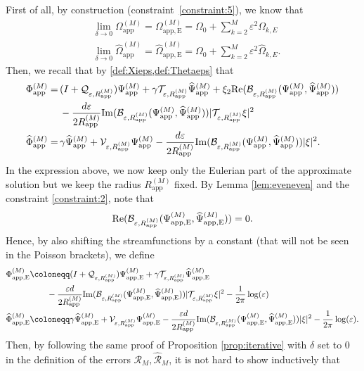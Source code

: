 \documentclass[11pt,reqno,a4paper]{amsart}
\def\eps{\varepsilon}
\def\Re{{\rm Re}}
\def\Im{{\rm Im}}
\newcommand{\cB}{\mathcal{B}}
\newcommand{\cQ}{\mathcal{Q}}
\newcommand{\cR}{\mathcal{R}}
\newcommand{\cT}{\mathcal{T}}
\newcommand{\cV}{\mathcal{V}}
\newcommand{\1}{\mathbbm{1}}
\theoremstyle{definition}
\theoremstyle{definition}
\numberwithin{equation}{section}
\newcommand{\Mapp}[2]{#1^{(#2)}_\mathrm{app}}
\newcommand{\Mappp}[3]{#1^{(#2)}_\mathrm{app,#3}}
\begin{document}
First of all, by construction (constraint~\ref{constraint:5}), we know that 
\begin{align}
\label{def:OmE}
    &\lim_{\delta \to 0}\Mapp{\Omega}{M}=\Mappp{\Omega}{M}{E}=\Omega_0+\sum_{k=2}^M\eps^2\Omega_{k,E}\\
    \label{def:OmhE}&\lim_{\delta \to 0}\Mapp{\widehat \Omega}{M}=\Mappp{\widehat \Omega}{M}{E}=\Omega_0+\sum_{k=2}^M\eps^2\widehat{\Omega}_{k,E}.
\end{align}
Then, we recall that by \cref{def:Xieps,def:Thetaeps} that
\begin{align}
    \Mapp{\Phi}{M}=\,&(I+\cQ_{\eps,\Mapp{R}{M}})\Mapp{\Psi}{M}+\gamma\cT_{\eps,\Mapp{R}{M}}\Mapp{\widehat \Psi}{M}+\xi_2\Re(\cB_{\eps,\Mapp{R}{M}}(\Mapp{\Psi}{M},\Mapp{\widehat{\Psi}}{M}))\\
    &-\frac{d \eps}{2 \Mapp{R}{M}}\Im(\cB_{\eps,\Mapp{R}{M}}(\Mapp{\Psi}{M},\Mapp{\widehat{\Psi}}{M}))|\cT_{\eps,\Mapp{R}{M}}\xi|^2\\
    \Mapp{\widehat \Phi}{M}=\,&\gamma \Mapp{\widehat{\Psi}}{M}+\cV_{\eps,\Mapp{R}{M}}\Mapp{\Psi}{M}-\frac{d \eps}{2 \Mapp{R}{M}}\Im(\cB_{\eps,\Mapp{R}{M}}(\Mapp{\Psi}{M},\Mapp{\widehat{\Psi}}{M}))|\xi|^2.
\end{align}
In the expression above, we now keep only the Eulerian part of the approximate solution but we keep the radius $\Mapp{R}{M}$ fixed. By Lemma \ref{lem:eveneven} and  the constraint \cref{constraint:2}, note that
\begin{equation}
    \Re(\cB_{\eps,\Mapp{R}{M}}(\Mappp{\Psi}{M}{E},\Mappp{\widehat{\Psi}}{M}{E}))=0.
\end{equation}
Hence, by also shifting the streamfunctions by a constant (that will not be seen in the Poisson brackets), we  define
\begin{align}
\label{def:PhiappE}\Mappp{\Phi}{M}{E}
    &\coloneqq(I+\cQ_{\eps,\Mapp{R}{M}})\Mappp{\Psi}{M}{E}+\gamma\cT_{\eps,\Mapp{R}{M}}\Mappp{\widehat \Psi}{M}{E}\\
   &\qquad -\frac{\eps d}{2 \Mapp{R}{M}} \Im(\cB_{\eps,\Mapp{R}{M}}(\Mappp{\Psi}{M}{E},\Mappp{\widehat \Psi}{M}{E}))|\cT_{\eps,\Mapp{R}{M}}\xi|^2-\frac{1}{2\pi}\log(\eps)\\
\label{def:PhihappE}\Mappp{\widehat \Phi}{M}{E}
&\coloneqq\gamma\Mappp{\widehat \Psi}{M}{E}+\cV_{\eps,\Mapp{R}{M}}\Mappp{\Psi}{M}{E}-\frac{\eps d}{2 \Mapp{R}{M}}\Im(\cB_{\eps,\Mapp{R}{M}}(\Mappp{\Psi}{M}{E},\Mappp{\widehat \Psi}{M}{E}))|\xi|^2-\frac{1}{2\pi}\log(\eps).
\end{align}
Then, by following the same proof of Proposition \ref{prop:iterative} with $\delta$ set to $0$ in the definition of the errors $\cR_{M},\widehat{\cR}_M$, it is not hard to show inductively that 
\end{document}
